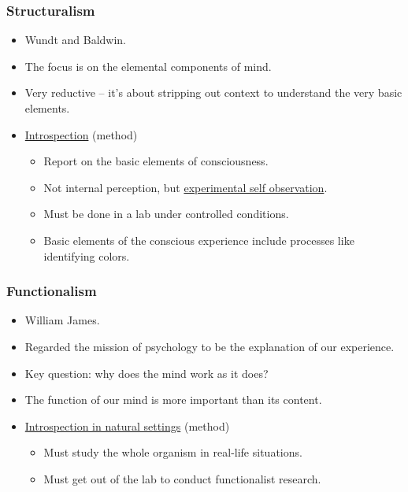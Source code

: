 \documentclass[]{article}
\begin{document}
			\subsubsection{Structuralism}
				\begin{itemize}
					\item Wundt and Baldwin.
					\item The focus is on the elemental components of mind.
					\item Very reductive -- it's about stripping out context to understand the very basic elements.
					
					\item \underline{Introspection} (method)
						\begin{itemize}
							\item Report on the basic elements of consciousness.
							\item Not internal perception, but \underline{experimental self observation}.
							\item Must be done in a lab under controlled conditions.
							\item Basic elements of the conscious experience include processes like identifying colors.
						\end{itemize}
				\end{itemize}
			
			\subsubsection{Functionalism}
				\begin{itemize}
					\item William James.
					\item Regarded the mission of psychology to be the explanation of our experience.
					\item Key question: why does the mind work as it does?
					\item The function of our mind is more important than its content.
					\item \underline{Introspection in natural settings} (method)
						\begin{itemize}
							\item Must study the whole organism in real-life situations.
							\item Must get out of the lab to conduct functionalist research.
						\end{itemize}
				\end{itemize}
			
\end{document}
